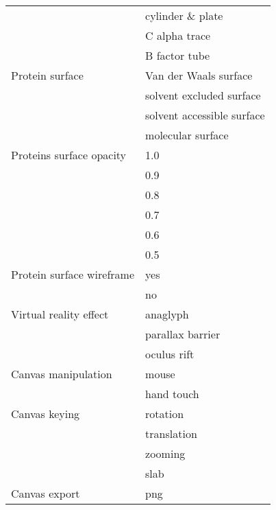 \documentclass[twocolumn]{bmcart}%
\begin{document}
\begin{backmatter}
\begin{table}[h!]
\begin{tabular}{ll}
                          & cylinder \& plate\\
                          & C alpha trace\\
                          & B factor tube\\
        \hline
          Protein surface & Van der Waals surface\\
                          & solvent excluded surface\\
                          & solvent accessible surface\\
                          & molecular surface\\
        \hline
 Proteins surface opacity & 1.0\\
                          & 0.9\\
                          & 0.8\\
                          & 0.7\\
                          & 0.6\\
                          & 0.5\\
        \hline
Protein surface wireframe & yes\\
                          & no\\
        \hline
   Virtual reality effect & anaglyph\\
                          & parallax barrier\\
                          & oculus rift\\
        \hline
      Canvas manipulation & mouse\\
                          & hand touch\\
        \hline
            Canvas keying & rotation\\
                          & translation\\
                          & zooming\\
                          & slab\\
        \hline
            Canvas export & png\\
        \hline
      \end{tabular}
\end{table}




\end{backmatter}
\end{document}

